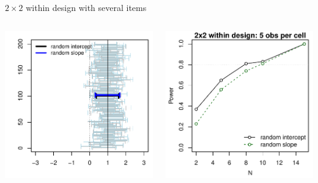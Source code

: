 \documentclass[aspectratio=169]{beamer}
\begin{document}
\begin{frame}{$2\times 2$ within design with several items}
  \begin{columns}
    \begin{column}{.5\textwidth}
      \includegraphics[scale=.8]{../figures/nico_cis_2x2design_5obs}
    \end{column}
    \begin{column}{.5\textwidth}
      \includegraphics[scale=.8]{../figures/nico_power_2x2design_5obs}
    \end{column}
  \end{columns}
\end{frame}
\end{document}
